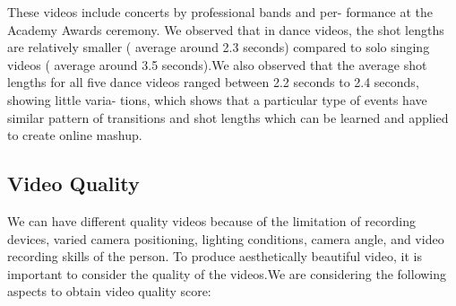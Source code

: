 \documentclass{sig-alternate-05-2015}
\begin{document}
\begin{itemize}
These videos include concerts by professional bands and per-
formance at the Academy Awards ceremony. We observed that
in dance videos, the shot lengths are relatively smaller ( average
around 2.3 seconds) compared to solo singing videos ( average
around 3.5 seconds).We also
observed that the average shot lengths for all five dance videos
ranged between 2.2 seconds to 2.4 seconds, showing little varia-
tions, which shows that a particular type of events have similar
pattern of transitions and shot lengths which can be learned and
applied to create online mashup.
\end{itemize}
\subsection{Video Quality}
We can have different quality videos because of the limitation of
recording devices, varied camera positioning, lighting conditions,
camera angle, and video recording skills of the person. To produce
aesthetically beautiful video, it is important to consider the quality
of the videos.We are considering the following aspects to obtain
video quality score:
\end{document}
